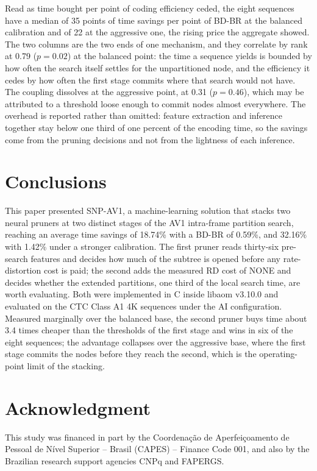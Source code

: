 \documentclass[conference]{IEEEtran}
\begin{document}
Read as time bought per point of coding efficiency ceded, the eight sequences
have a median of 35 points of time savings per point of BD-BR at the balanced
calibration and of 22 at the aggressive one, the rising price the aggregate
showed. The two columns are the two ends of one mechanism, and they correlate by
rank at 0.79 ($p = 0.02$) at the balanced point: the time a sequence yields is
bounded by how often the search itself settles for the unpartitioned node, and
the efficiency it cedes by how often the first stage commits where that search
would not have. The coupling dissolves at the aggressive point, at 0.31
($p = 0.46$), which may be attributed to a threshold loose enough to commit nodes
almost everywhere. The overhead is reported rather than omitted: feature
extraction and inference together stay below one third of one percent of the
encoding time, so the savings come from the pruning decisions and not from the
lightness of each inference.

\section{Conclusions}

This paper presented SNP-AV1, a machine-learning solution that stacks two neural
pruners at two distinct stages of the AV1 intra-frame partition search, reaching
an average time savings of 18.74\% with a BD-BR of 0.59\%, and 32.16\% with
1.42\% under a stronger calibration. The first pruner reads thirty-six pre-search
features and decides how much of the subtree is opened before any
rate-distortion cost is paid; the second adds the measured RD cost of NONE and
decides whether the extended partitions, one third of the local search time, are
worth evaluating. Both were implemented in C inside libaom v3.10.0 and evaluated
on the CTC Class A1 4K sequences under the AI configuration. Measured marginally
over the balanced base, the second pruner buys time about 3.4 times cheaper than
the thresholds of the first stage and wins in six of the eight sequences; the
advantage collapses over the aggressive base, where the first stage commits the
nodes before they reach the second, which is the operating-point limit of the
stacking.

\section*{Acknowledgment}

This study was financed in part by the Coordena\c{c}\~ao de Aperfei\c{c}oamento de
Pessoal de N\'ivel Superior -- Brasil (CAPES) -- Finance Code 001, and also by the
Brazilian research support agencies CNPq and FAPERGS.
\end{document}
